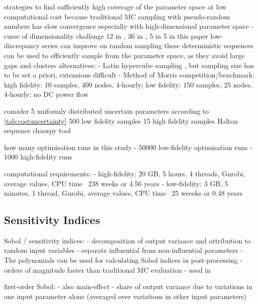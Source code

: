 strategies to find sufficiently high coverage of the parameter space at low computational cost \cite{fajraoui_optimal_2017,usher_value_2015}
because traditional MC sampling with pseudo-random numbers has slow convergence %
especially with high-dimensional parameter space - curse of dimensionality challenge
12 in \cite{trondle_trade-offs_2020}, 36 in \cite{pilpola_analyzing_2020}, 5 in \cite{shirizadeh_how_2019} 5 in this paper
low-discrepancy series can improve on random sampling
these deterministic sequences can be used to efficiently sample from the parameter space, as they avoid large gaps and clusters \cite{fajraoui_optimal_2017}
alternatives:
- Latin hypercube sampling \cite{trondle_trade-offs_2020}, but sampling size has to be set a priori, extensions difficult \cite{fajraoui_optimal_2017}
- Method of Morris \cite{usher_value_2015,mavromatidis_uncertainty_2018}
competition/benchmark: \cite{trondle_trade-offs_2020} high fidelity: 10 samples, 400 nodes, 4-hourly; low fidelity: 150 samples, 25 nodes, 4-hourly; no DC power flow

consider 5 uniformly distributed uncertain parameters according to \cref{tab:costuncertainty}
500 low fidelity samples
15 high fidelity samples
Halton sequence
chaospy tool \cite{feinberg_chaospy_2015}

how many optimisation runs in this study
- 50000 low-fidelity optimisation runs
- 1000 high-fidelity runs

computational requirements:
- high-fidelity: 20 GB, 5 hours, 4 threads, Gurobi, average values, CPU time ~238 weeks or 4.56 years
- low-fidelity: 3 GB, 5 minutes, 1 thread, Gurobi, average values, CPU time ~25 weeeks or 0.48 years

\subsection{Sensitivity Indices}
\label{sec:sobol}

Sobol / sensitivity indices:
- decomposition of output variance and attribution to random input variables
- separate influential from non-influential parameters
- The polynomials can be used for calculating Sobol indices in post-processing
- orders of magnitude faster than traditional MC evaluation \cite{sudret_global_2008}
- used in \cite{trondle_trade-offs_2020,mavromatidis_uncertainty_2018}

first-order Sobol:
- also main-effect
- share of output variance due to variations in one input parameter alone (averaged over variations in other input parameters)

